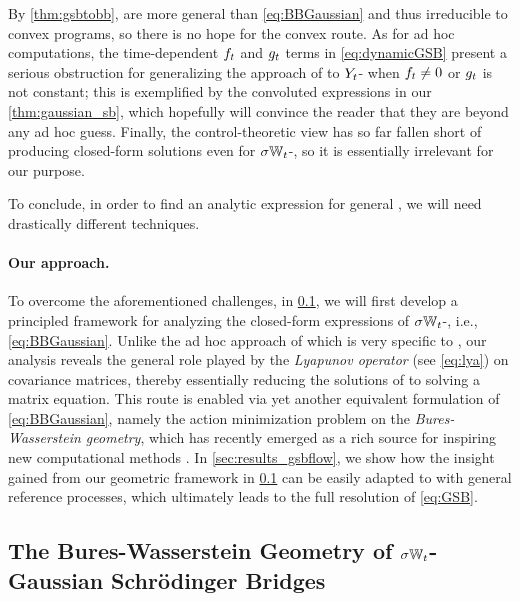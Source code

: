 By \cref{thm:gsbtobb},  are more general than \eqref{eq:BBGaussian} and thus irreducible to convex programs, so there is no hope for the convex route. As for ad hoc computations, the time-dependent $\driftf$ and $\volat[\ctime]$ terms in \eqref{eq:dynamicGSB} present a serious obstruction for generalizing the approach of \citet{mallasto2021entropy} to $\refsde$- when $\driftf \neq 0$ or $\volat[\ctime]$ is not constant; this is exemplified by the convoluted expressions in our \cref{thm:gaussian_sb}, which hopefully will convince the reader that they are beyond any ad hoc guess. Finally, the control-theoretic view has so far fallen short of producing closed-form solutions even for $\sigma\Wiener$-, so it is essentially irrelevant for our purpose. 

To conclude, in order to find an analytic expression for general , we will need drastically different techniques.

\paragraph{Our approach.}

To overcome the aforementioned challenges, in \cref{sec:mechanics_gsbflow}, we will first develop a principled framework for analyzing the closed-form expressions of $\sigma\Wiener$-, i.e., \eqref{eq:BBGaussian}. Unlike the ad hoc approach of \citet{mallasto2021entropy} which is very specific to , our analysis reveals the general role played by the \emph{Lyapunov operator} (see \eqref{eq:lya}) on covariance matrices, thereby essentially reducing the solutions of  to solving a matrix equation. This route is enabled via yet another equivalent formulation of \eqref{eq:BBGaussian}, namely the action minimization problem on the \emph{Bures-Wasserstein geometry}, which has recently emerged as a rich source for inspiring new computational methods \citep{chewi2020gradient, altschuler2021averaging, han2021riemannian}. In \cref{sec:results_gsbflow}, we show how the insight gained from our geometric framework in \cref{sec:mechanics_gsbflow} can be easily adapted to  with general reference processes, which ultimately leads to the full resolution of \eqref{eq:GSB}.

\subsection{The Bures-Wasserstein Geometry of $\sigma\Wiener$-Gaussian Schr\"odinger Bridges}
\label{sec:mechanics_gsbflow}

